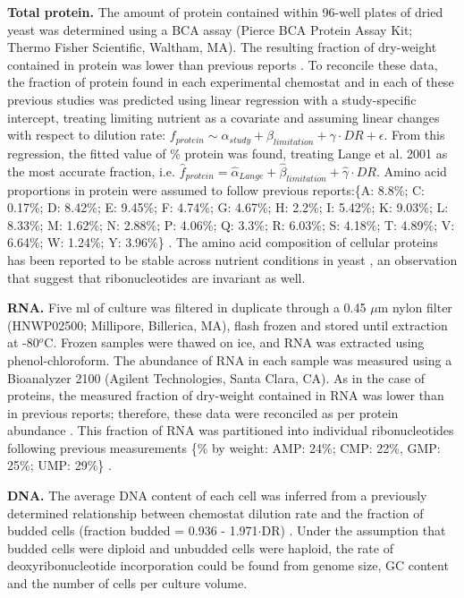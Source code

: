 \textbf{Total protein.} The amount of protein contained within 96-well plates of dried yeast was determined using a BCA assay (Pierce BCA Protein Assay Kit; Thermo Fisher Scientific, Waltham, MA). The resulting fraction of dry-weight contained in protein was lower than previous reports \cite{Schulze:1995uv, Lange:2001th}.  To reconcile these data, the fraction of protein found in each experimental chemostat and in each of these previous studies was predicted using linear regression with a study-specific intercept, treating limiting nutrient as a covariate and assuming linear changes with respect to dilution rate: $f_{protein} \sim \alpha_{study} + \beta_{limitation} + \gamma \cdot DR + \epsilon$.  From this regression, the fitted value of \% protein was found, treating Lange et al. 2001 as the most accurate fraction, i.e. $\hat{f}_{protein} = \hat{\alpha}_{Lange} + \hat{\beta}_{limitation} + \hat{\gamma} \cdot DR$.  Amino acid proportions in protein were assumed to follow previous reports:\{A: 8.8\%; C: 0.17\%; D: 8.42\%; E: 9.45\%; F: 4.74\%; G: 4.67\%; H: 2.2\%; I: 5.42\%; K: 9.03\%; L: 8.33\%; M: 1.62\%; N: 2.88\%; P: 4.06\%; Q: 3.3\%; R: 6.03\%; S: 4.18\%; T: 4.89\%; V: 6.64\%; W: 1.24\%; Y: 3.96\%\} \cite{Herrgard:2008gb}.  The amino acid composition of cellular proteins has been reported to be stable across nutrient conditions in yeast \cite{Lange:2001th}, an observation that suggest that ribonucleotides are invariant as well.

\textbf{RNA.} Five ml of culture was filtered in duplicate through a 0.45 $\mu$m nylon filter (HNWP02500; Millipore, Billerica, MA), flash frozen and stored until extraction at -80$^{o}$C.  Frozen samples were thawed on ice, and RNA was extracted using phenol-chloroform.  The abundance of RNA in each sample was measured using a Bioanalyzer 2100 (Agilent Technologies, Santa Clara, CA).  As in the case of proteins, the measured fraction of dry-weight contained in RNA was lower than in previous reports; therefore, these data were reconciled as per protein abundance \cite{Schulze:1995uv, Lange:2001th}. This fraction of RNA was partitioned into individual ribonucleotides following previous measurements \{\% by weight: AMP: 24\%; CMP: 22\%, GMP: 25\%; UMP: 29\%\} \cite{Herrgard:2008gb}.

\textbf{DNA.} The average DNA content of each cell was inferred from a previously determined relationship between chemostat dilution rate and the fraction of budded cells (fraction budded = 0.936 - 1.971$\cdot$DR) \cite{Brauer:2008jn}.  Under the assumption that budded cells were diploid and unbudded cells were haploid, the rate of deoxyribonucleotide incorporation could be found from genome size, GC content and the number of cells per culture volume.

